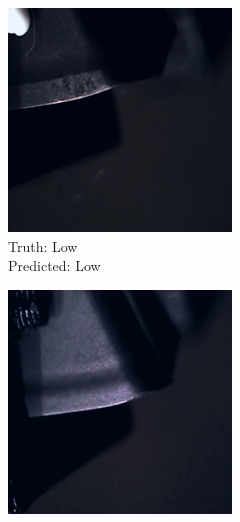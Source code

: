 	\begin{figure}[hbtp]
		\begin{subfigure}{.24\textwidth}
			\centering
			\includegraphics[width=\linewidth]{fig/results/wandb/spaghetti_dataset/images/media_images_Examples_142_p1_t1.png}
			\caption{Truth: Low \\Predicted: Low}
		\end{subfigure}
		\hspace*{\fill}
		\begin{subfigure}{.24\textwidth}
			\centering
			\includegraphics[width=\linewidth]{fig/results/wandb/spaghetti_dataset/images/media_images_Examples_176_p2_t2.png}

\end{subfigure}
\end{figure}
